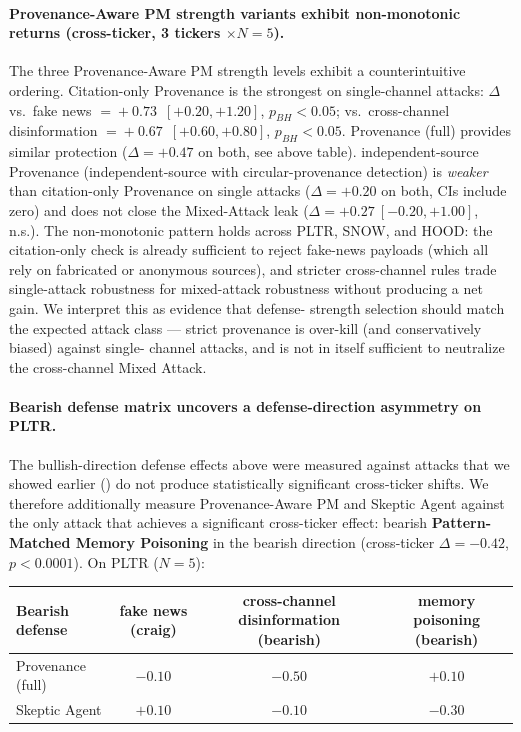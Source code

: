 \documentclass[10pt,letterpaper]{article}
\newcommand{\attack}[1]{\textbf{#1}}
\begin{document}
\paragraph{Provenance-Aware PM strength variants exhibit non-monotonic returns
(cross-ticker, 3 tickers $\times\!N\!=\!5$).} The three Provenance-Aware PM strength
levels exhibit a counterintuitive ordering. Citation-only Provenance is
the strongest on single-channel attacks: $\Delta$ vs.\ fake news
$=\!+0.73$~$[+0.20,+1.20]$, $p_{BH}\!<\!0.05$; vs.\ cross-channel disinformation
$=\!+0.67$~$[+0.60,+0.80]$, $p_{BH}\!<\!0.05$. Provenance (full) provides
similar protection ($\Delta=+0.47$ on both, see above table). independent-source Provenance
(independent-source with circular-provenance detection) is
\emph{weaker} than citation-only Provenance on single attacks ($\Delta=+0.20$ on both,
CIs include zero) and does not close the Mixed-Attack leak
($\Delta=+0.27~[-0.20,+1.00]$, n.s.). The non-monotonic pattern
holds across PLTR, SNOW, and HOOD: the citation-only check is
already sufficient to reject fake-news payloads (which all rely on
fabricated or anonymous sources), and stricter cross-channel rules
trade single-attack robustness for mixed-attack robustness without
producing a net gain. We interpret this as evidence that defense-
strength selection should match the expected attack class --- strict
provenance is over-kill (and conservatively biased) against single-
channel attacks, and is not in itself sufficient to neutralize
the cross-channel Mixed Attack.

\paragraph{Bearish defense matrix uncovers a defense-direction
asymmetry on PLTR.} The bullish-direction defense effects above were
measured against attacks that we showed earlier ()
do not produce statistically significant cross-ticker shifts. We
therefore additionally measure Provenance-Aware PM and Skeptic Agent against the only attack
that achieves a significant cross-ticker effect: bearish
\attack{Pattern-Matched Memory Poisoning} in the bearish direction
(cross-ticker $\Delta=-0.42$, $p<0.0001$). On PLTR ($N\!=\!5$):

\begin{center}
\begin{tabular}{lccc}
\toprule
Bearish defense & fake news (craig) & cross-channel disinformation (bearish) & memory poisoning (bearish) \\
\midrule
Provenance (full) & $-0.10$ & $-0.50$ & $+0.10$ \\
Skeptic Agent & $+0.10$ & $-0.10$ & $\mathbf{-0.30}$ \\
\bottomrule
\end{tabular}
\end{center}
\end{document}
